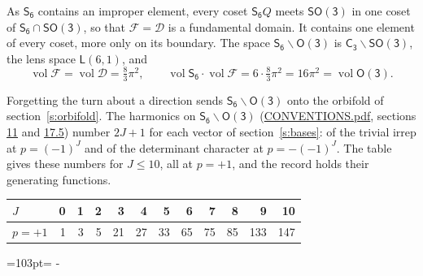 \documentclass[10pt,a4paper]{article}
\newcommand{\needspace}[1]{\par\penalty-100\begingroup\dimen0=#1\relax\dimen2=\pagegoal
  \advance\dimen2-\pagetotal\ifdim\dimen0>\dimen2\relax\ifdim\dimen2>0pt\vfil\break\fi\fi
  \endgroup}
\numberwithin{equation}{section}
\newcommand{\grp}[1]{\mathsf{#1}}
\newcommand{\vol}{\operatorname{vol}}
\newcommand{\fcell}{\mathcal{D}}
\newcommand{\fdomain}{\mathcal{F}}
\newcommand{\lensspace}[2]{\mathsf{L}(#1, #2)}
\begin{document}
\leavevmode\label{n:set.fundamental}As $\grp{S_{6}}$ contains an improper element, every coset $\grp{S_{6}}Q$ meets \href{SO3.pdf}{$\grp{SO(3)}$} in one coset of $\grp{S_{6}} \cap \grp{SO(3)}$, so that $\fdomain = \fcell$ is a fundamental domain. It contains one element of every coset, more only on its boundary.
\leavevmode\label{n:set.lens}The space $\grp{S_{6}}\backslash\grp{O(3)}$ is $\grp{C_{3}}\backslash\grp{SO(3)}$, the lens space $\lensspace{6}{1}$, and
\begin{equation}\label{e:volume}\vol\fdomain = \vol\fcell = \tfrac{8}{3}\pi^2,\qquad \vol\grp{S_{6}}\cdot\vol\fdomain = 6\cdot \tfrac{8}{3}\pi^2 = 16\pi^2 = \vol\grp{O(3)}.\end{equation}

Forgetting the turn about a direction sends $\grp{S_{6}}\backslash\grp{O(3)}$ onto the orbifold of section~\ref{s:orbifold}.
The harmonics on $\grp{S_{6}}\backslash\grp{O(3)}$ (\href{../../CONVENTIONS.pdf}{CONVENTIONS.pdf}, sections \href{../../CONVENTIONS.pdf\#conv.11}{11} and \href{../../CONVENTIONS.pdf\#conv.17.5}{17.5}) number $2J + 1$ for each vector of section~\ref{s:bases}: of the trivial irrep at $p = (-1)^J$ and of the determinant character at $p = -(-1)^J$. The table gives these numbers for $J \le 10$, all at $p = +1$, and the record holds their generating functions.
{\small\setlength{\tabcolsep}{4pt}\begin{longtable}{@{}lrrrrrrrrrrr@{}}\toprule
$J$ & 0 & 1 & 2 & 3 & 4 & 5 & 6 & 7 & 8 & 9 & 10\\\midrule\endhead
\bottomrule\endfoot\endlastfoot
$p = +1$ & 1 & 3 & 5 & 21 & 27 & 33 & 65 & 75 & 85 & 133 & 147\\
\bottomrule\end{longtable}}
\needspace{103pt}
\end{document}
